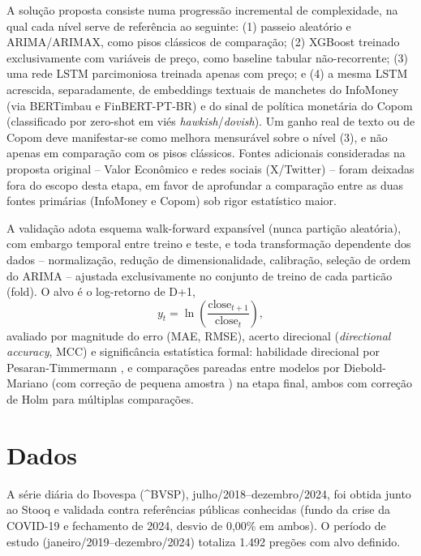 \documentclass[conference]{IEEEtran}
\begin{document}
A solu\c{c}\~ao proposta consiste numa progress\~ao incremental de complexidade, na qual cada n\'ivel serve de refer\^encia ao seguinte: (1) passeio aleat\'orio e ARIMA/ARIMAX, como pisos cl\'assicos de compara\c{c}\~ao; (2) XGBoost treinado exclusivamente com vari\'aveis de pre\c{c}o, como baseline tabular n\~ao-recorrente; (3) uma rede LSTM parcimoniosa treinada apenas com pre\c{c}o; e (4) a mesma LSTM acrescida, separadamente, de embeddings textuais de manchetes do InfoMoney (via BERTimbau e FinBERT-PT-BR) e do sinal de pol\'itica monet\'aria do Copom (classificado por zero-shot em vi\'es \emph{hawkish}/\emph{dovish}). Um ganho real de texto ou de Copom deve manifestar-se como melhora mensur\'avel sobre o n\'ivel (3), e n\~ao apenas em compara\c{c}\~ao com os pisos cl\'assicos. Fontes adicionais consideradas na proposta original -- Valor Econ\^omico e redes sociais (X/Twitter) -- foram deixadas fora do escopo desta etapa, em favor de aprofundar a compara\c{c}\~ao entre as duas fontes prim\'arias (InfoMoney e Copom) sob rigor estat\'istico maior.

A valida\c{c}\~ao adota esquema walk-forward expans\'ivel (nunca parti\c{c}\~ao aleat\'oria), com embargo temporal entre treino e teste, e toda transforma\c{c}\~ao dependente dos dados -- normaliza\c{c}\~ao, redu\c{c}\~ao de dimensionalidade, calibra\c{c}\~ao, sele\c{c}\~ao de ordem do ARIMA -- ajustada exclusivamente no conjunto de treino de cada partic\~ao (fold). O alvo \'e o log-retorno de D+1,
\begin{equation}
y_t = \ln\!\left(\frac{\text{close}_{t+1}}{\text{close}_t}\right),
\label{eq:target}
\end{equation}
avaliado por magnitude do erro (MAE, RMSE), acerto direcional (\emph{directional accuracy}, MCC) e signific\^ancia estat\'istica formal: habilidade direcional por Pesaran-Timmermann \cite{pesaran1992}, e compara\c{c}\~oes pareadas entre modelos por Diebold-Mariano \cite{diebold1995} (com corre\c{c}\~ao de pequena amostra \cite{harvey1997}) na etapa final, ambos com corre\c{c}\~ao de Holm para m\'ultiplas compara\c{c}\~oes.

\section{Dados}

A s\'erie di\'aria do Ibovespa (\^{}BVSP), julho/2018--dezembro/2024, foi obtida junto ao Stooq e validada contra refer\^encias p\'ublicas conhecidas (fundo da crise da COVID-19 e fechamento de 2024, desvio de 0,00\% em ambos). O per\'iodo de estudo (janeiro/2019--dezembro/2024) totaliza 1.492 preg\~oes com alvo definido.
\end{document}
